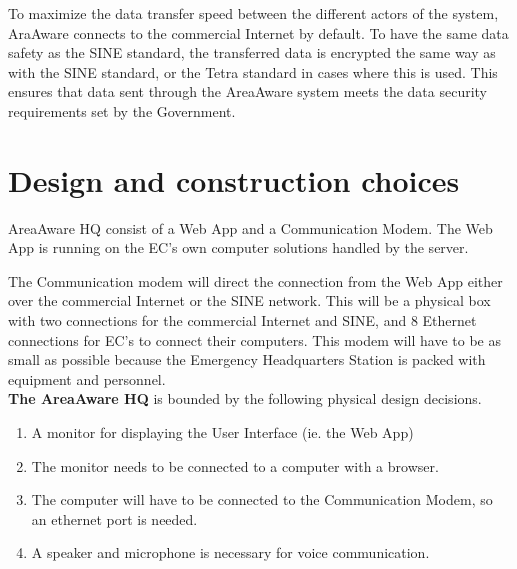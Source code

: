 To maximize the data transfer speed between the different actors of the system, AraAware connects to the commercial Internet by default. To have the same data safety as the SINE standard, the transferred data is encrypted the same way as with the SINE standard, or the Tetra standard in cases where this is used. This ensures that data sent through the AreaAware system meets the data security requirements set by the Government.


\section{Design and construction choices}
AreaAware HQ consist of a Web App and a Communication Modem. The Web App is running on the EC's own computer solutions handled by the server. 

The Communication modem will direct the connection from the Web App either over the commercial Internet or the SINE network. This will be a physical box with two connections for the commercial Internet and SINE, and 8 Ethernet connections for EC's to connect their computers. This modem will have to be as small as possible because the Emergency Headquarters Station is packed with equipment and personnel.\\

\noindent \textbf{The AreaAware HQ} is bounded by the following physical design decisions.
\begin{enumerate}[label=D-HQ\arabic*,leftmargin=1.4cm]
	\item A monitor for displaying the User Interface (ie. the Web App)
	\item The monitor needs to be connected to a computer with a browser.
	\item The computer will have to be connected to the Communication Modem, so an ethernet port is needed.
	\item A speaker and microphone is necessary for voice communication. \\
\end{enumerate}

